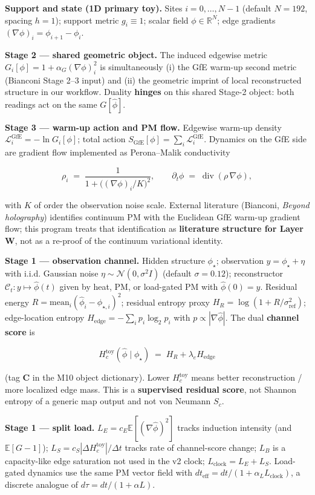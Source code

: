 \documentclass[
  11pt,
]{article}
\begin{document}
\textbf{Support and state (1D primary toy).} Sites \(i=0,\ldots,N-1\) (default \(N=192\), spacing \(h=1\)); support metric \(g_i\equiv 1\); scalar field \(\phi\in\mathbb{R}^N\); edge gradients \((\nabla\phi)_i=\phi_{i+1}-\phi_i\).

\textbf{Stage 2 --- shared geometric object.} The induced edgewise metric \(G_i[\phi]=1+\alpha_G(\nabla\phi)_i^2\) is simultaneously (i) the GfE warm-up second metric (Bianconi Stage 2--3 input) and (ii) the geometric imprint of local reconstructed structure in our workflow. Duality \textbf{hinges} on this shared Stage-2 object: both readings act on the same \(G[\hat\phi]\).

\textbf{Stage 3 --- warm-up action and PM flow.} Edgewise warm-up density \(\mathcal{L}_i^{\mathrm{GfE}}=-\ln G_i[\phi]\); total action \(S_{\mathrm{GfE}}[\phi]=\sum_i\mathcal{L}_i^{\mathrm{GfE}}\). Dynamics on the GfE side are gradient flow implemented as Perona--Malik conductivity

\[
\rho_i \;=\; \frac{1}{1+\bigl((\nabla\phi)_i/K\bigr)^2},\qquad
\partial_t\phi \;=\; \operatorname{div}(\rho\,\nabla\phi),
\]

with \(K\) of order the observation noise scale. External literature (Bianconi, \emph{Beyond holography}) identifies continuum PM with the Euclidean GfE warm-up gradient flow; this program treats that identification as \textbf{literature structure for Layer W}, not as a re-proof of the continuum variational identity.

\textbf{Stage 1 --- observation channel.} Hidden structure \(\phi_\star\); observation \(y=\phi_\star+\eta\) with i.i.d. Gaussian noise \(\eta\sim\mathcal{N}(0,\sigma^2 I)\) (default \(\sigma=0.12\)); reconstructor \(\mathcal{C}_t:y\mapsto\hat\phi(t)\) given by heat, PM, or load-gated PM with \(\hat\phi(0)=y\). Residual energy \(R=\mathrm{mean}_i(\hat\phi_i-\phi_{\star,i})^2\); residual entropy proxy \(H_R=\log(1+R/\sigma_{\mathrm{ref}}^2)\); edge-location entropy \(H_{\mathrm{edge}}=-\sum_i p_i\log_2 p_i\) with \(p\propto|\nabla\hat\phi|\). The dual \textbf{channel score} is

\[
H_c^{\mathrm{toy}}(\hat\phi\mid\phi_\star) \;=\; H_R + \lambda_e H_{\mathrm{edge}}
\]

(tag \textbf{C} in the M10 object dictionary). Lower \(H_c^{\mathrm{toy}}\) means better reconstruction / more localized edge mass. This is a \textbf{supervised residual score}, not Shannon entropy of a generic map output and not von Neumann \(S_c\).

\textbf{Stage 1 --- split load.} \(L_E=c_E\mathbb{E}[(\nabla\hat\phi)^2]\) tracks induction intensity (and \(\mathbb{E}[G-1]\)); \(L_S=c_S|\Delta H_c^{\mathrm{toy}}|/\Delta t\) tracks rate of channel-score change; \(L_B\) is a capacity-like edge saturation not used in the v2 clock; \(L_{\mathrm{clock}}=L_E+L_S\). Load-gated dynamics use the same PM vector field with \(dt_{\mathrm{eff}}=dt/(1+\alpha_L L_{\mathrm{clock}})\), a discrete analogue of \(d\tau=dt/(1+\alpha L)\).
\end{document}
